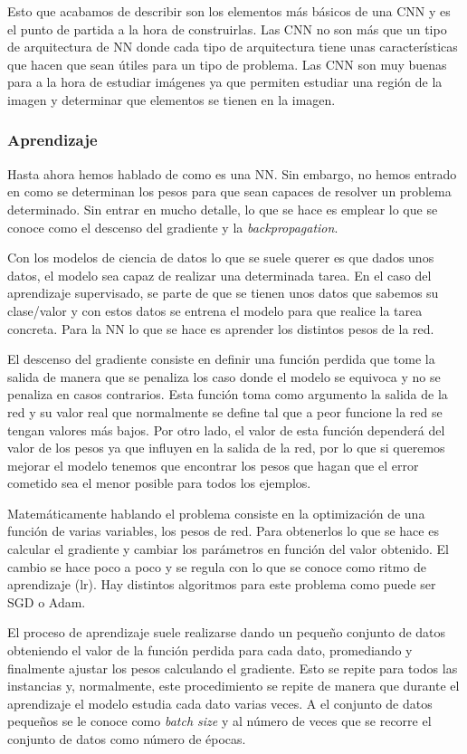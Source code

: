 \documentclass[a4paper,12pt,twoside,titlepage]{article}
\begin{document}
Esto que acabamos de describir son los elementos más básicos de una CNN y es el punto de partida a la hora de construirlas. Las CNN no son más que un tipo de arquitectura de NN donde cada tipo de arquitectura tiene unas características que hacen que sean útiles para un tipo de problema. Las CNN son muy buenas para a la hora de estudiar imágenes ya que permiten estudiar una región de la imagen y determinar que elementos se tienen en la imagen.

\subsubsection*{Aprendizaje}

Hasta ahora hemos hablado de como es una NN. Sin embargo, no hemos entrado en como se determinan los pesos para que sean capaces de resolver un problema determinado. Sin entrar en mucho detalle, lo que se hace es emplear lo que se conoce como el descenso del gradiente y la \textit{backpropagation}.

Con los modelos de ciencia de datos lo que se suele querer es que dados unos datos, el modelo sea capaz de realizar una determinada tarea. En el caso del aprendizaje supervisado, se parte de que se tienen unos datos que sabemos su clase/valor y con estos datos se entrena el modelo para que realice la tarea concreta. Para la NN lo que se hace es aprender los distintos pesos de la red.

El descenso del gradiente consiste en definir una función perdida que tome la salida de manera que se penaliza los caso donde el modelo se equivoca y no se penaliza en casos contrarios. Esta función toma como argumento la salida de la red y su valor real que normalmente se define tal que a peor funcione la red se tengan valores más bajos. Por otro lado, el valor de esta función dependerá del valor de los pesos ya que influyen en la salida de la red, por lo que si queremos mejorar el modelo tenemos que encontrar los pesos que hagan que el error cometido sea el menor posible para todos los ejemplos.

Matemáticamente hablando el problema consiste en la optimización de una función de varias variables, los pesos de red. Para obtenerlos lo que se hace es calcular el gradiente y cambiar los parámetros en función del valor obtenido. El cambio se hace poco a poco y se regula con lo que se conoce como ritmo de aprendizaje (lr). Hay distintos algoritmos para este problema como puede ser SGD o Adam.

El proceso de aprendizaje suele realizarse dando un pequeño conjunto de datos obteniendo el valor de la función perdida para cada dato, promediando y finalmente ajustar los pesos calculando el gradiente. Esto se repite para todos las instancias y, normalmente, este procedimiento se repite de manera que durante el aprendizaje el modelo estudia cada dato varias veces. A el conjunto de datos pequeños se le conoce como \textit{batch size} y al número de veces que se recorre el conjunto de datos como número de épocas.
\end{document}
